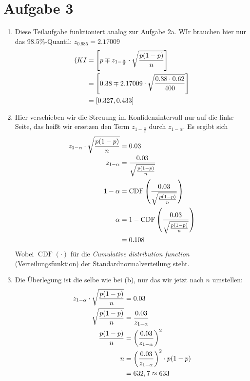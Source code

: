 \documentclass{article}
\DeclareMathOperator{\CDF}{CDF}
\begin{document}
	\section*{Aufgabe 3}
	\begin{enumerate}[label=(\alph*)]
		\item Diese Teilaufgabe funktioniert analog zur Aufgabe 2a. WIr brauchen hier nur das 98.5\%-Quantil: $z_{0.985}=2.17009$
		\begin{align}(
			KI &= \left[p \mp z_{1-\frac{\alpha}{2}}\cdot\sqrt{\frac{p(1-p)}{n}}\right] \notag \\
			&= \left[0.38 \mp 2.17009\cdot\sqrt{\frac{0.38\cdot 0.62}{400}}\right] \notag \\
			&= [0.327,0.433] \notag
		\end{align}
		\item Hier verschieben wir die Streuung im Konfidenzintervall nur auf die linke Seite, das heißt wir ersetzen den Term $z_{1-\frac{\alpha}{2}}$ durch $z_{1-\alpha}$. Es ergibt sich
		\begin{align}
			z_{1-\alpha}\cdot\sqrt{\frac{p(1-p)}{n}} &= 0.03 \notag \\
			z_{1-\alpha} &= \frac{0.03}{\sqrt{\frac{p(1-p)}{n}}} \notag \\
			1-\alpha &= \CDF\left(\frac{0.03}{\sqrt{\frac{p(1-p)}{n}}}\right) \notag \\
			\alpha &= 1 - \CDF\left(\frac{0.03}{\sqrt{\frac{p(1-p)}{n}}}\right) \notag \\
			&= 0.108 \notag
		\end{align}
		Wobei $\CDF(\cdot)$ für die \textit{Cumulative distribution function} (Verteilungsfunktion) der Standardnormalverteilung steht.
		\item Die Überlegung ist die selbe wie bei (b), nur das wir jetzt nach $n$ umstellen:
		\begin{align}
			z_{1-\alpha}\cdot\sqrt{\frac{p(1-p)}{n}} &= 0.03 \notag \\
			\sqrt{\frac{p(1-p)}{n}} &= \frac{0.03}{z_{1-\alpha}} \notag \\
			\frac{p(1-p)}{n} &= \left(\frac{0.03}{z_{1-\alpha}}\right)^2 \notag \\
			n &= \left(\frac{0.03}{z_{1-\alpha}}\right)^2\cdot p(1-p) \notag \\
			&= 632,7 \approx 633 \notag
		\end{align}
	\end{enumerate}
	
\end{document}
